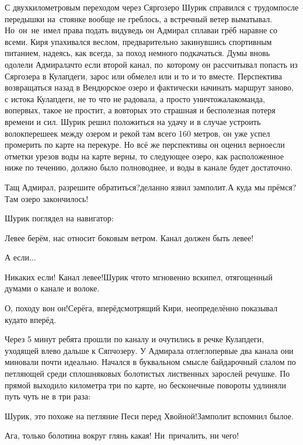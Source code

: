 С двухкилометровым переходом через Сяргозеро Шурик справился с трудом\mdash после передышки на~стоянке вообще не греблось, а встречный ветер выматывал. Но~он~не~имел права подать виду\mdash ведь он Адмирал сплава\mdash и грёб наравне со всеми. Киря упахивался веслом, предварительно закинувшись спортивным питанием, надеясь, как всегда, за поход немного подкачаться. Думы вновь одолели Адмирала\mdash что если второй канал, по~которому он рассчитывал попасть из Сяргозера в Кулапдеги, зарос или обмелел или и то и то вместе. Перспектива возвращаться назад в Вендюрское озеро и фактически начинать маршрут заново, с истока Кулапдеги, не то что не радовала, а просто уничтожала\mdash команда, во\sdash первых, такое не простит, а во\sdash вторых это страшная и бесполезная потеря времени и сил. Шурик решил положиться на удачу и в случае устроить волок\mdash перешеек между озером и рекой там всего 160 метров, он уже успел промерить по карте на перекуре. Но всё же перспективы он оценил верно\mdash если отметки урезов воды на карте верны, то следующее озеро, как расположенное ниже по течению, должно было полноводнее, и воды в канале будет достаточно.

\diagdash Тащ Адмирал, разрешите обратиться?\mdash деланно язвил замполит.\mdash А куда мы прёмся? Там озеро закончилось!

Шурик поглядел на навигатор:

\diagdash Левее берём, нас относит боковым ветром. Канал должен быть левее!

\diagdash А если$\ldots$

\diagdash Никаких если! Канал левее!\mdash Шурик что\sdash то мгновенно вскипел, отягощенный думами о канале и волоке.

\diagdash О, походу вон он!\mdash Серёга, вперёдсмотрящий Кири, неопределённо показывал куда\sdash то вперёд.

Через 5 минут ребята прошли по каналу и очутились в речке Кулапдеги, уходящей влево дальше к Сяпчозеру. У Адмирала отлегло\mdash первые два канала они миновали почти идеально. Начался в буквальном смысле байдарочный слалом по петляющей среди сплошняковых болотистых лиственных зарослей речушке. По прямой выходило километра три по карте, но бесконечные повороты удлиняли путь чуть не в три раза:

\diagdash Шурик, это похоже на петляние Песи перед Хвойной!\mdash Замполит вспомнил былое.

\diagdash Ага, только болотина вокруг глянь какая! Ни~причалить, ни чего!

